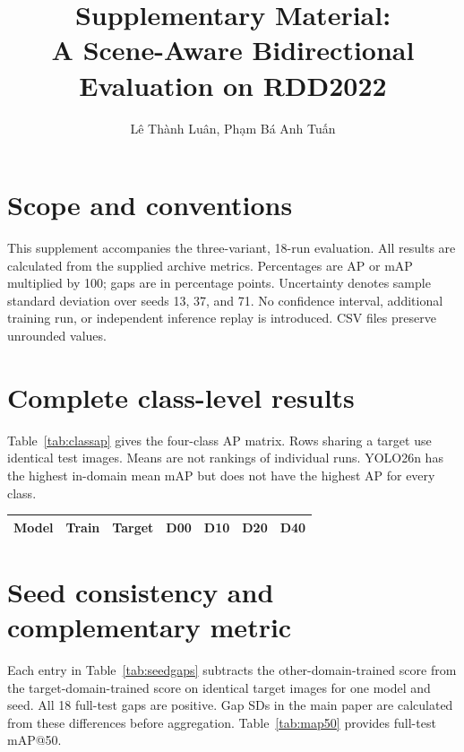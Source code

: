 \documentclass[10pt,a4paper]{article}
\title{\vspace{-12mm}\large\bfseries Supplementary Material:\\A Scene-Aware Bidirectional Evaluation on RDD2022}
\author{\normalsize Lê Thành Luân, Phạm Bá Anh Tuấn}
\date{}
\begin{document}
\maketitle
\vspace{-8mm}
\section*{Scope and conventions}
This supplement accompanies the three-variant, 18-run evaluation. All results are calculated from the supplied archive metrics. Percentages are AP or mAP multiplied by 100; gaps are in percentage points. Uncertainty denotes sample standard deviation over seeds 13, 37, and 71. No confidence interval, additional training run, or independent inference replay is introduced. CSV files preserve unrounded values.

\section*{Complete class-level results}
Table~\ref{tab:classap} gives the four-class AP matrix. Rows sharing a target use identical test images. Means are not rankings of individual runs. YOLO26n has the highest in-domain mean mAP but does not have the highest AP for every class.

\begin{center}
\label{tab:classap}
\begin{tabular}{lllrrrr}\toprule
Model & Train & Target & D00 & D10 & D20 & D40\\\midrule

\end{tabular}
\end{center}

\section*{Seed consistency and complementary metric}
Each entry in Table~\ref{tab:seedgaps} subtracts the other-domain-trained score from the target-domain-trained score on identical target images for one model and seed. All 18 full-test gaps are positive. Gap SDs in the main paper are calculated from these differences before aggregation. Table~\ref{tab:map50} provides full-test mAP@50.
\end{document}
